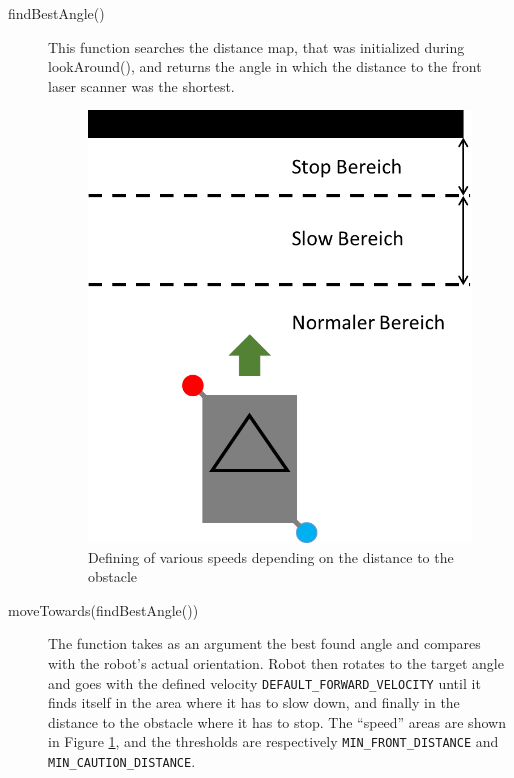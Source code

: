 \begin{description}
\item[findBestAngle()] This function searches the distance map, that was initialized during lookAround(), and returns the angle in which the distance to the front laser scanner was the shortest. 

\begin{figure}[ht]
\centering
\includegraphics[scale=0.6]{graphics/Zone.png}
\caption{Defining of various speeds depending on the distance to the obstacle}
\label{Zone}
\centering
\end{figure}

\item[moveTowards(findBestAngle())] The function takes as an argument the best found angle and compares with the robot's actual orientation. Robot then rotates to the target angle and goes with the defined velocity \texttt{DEFAULT\_FORWARD\_VELOCITY}
 until it finds itself in the area where it has to slow down, and finally in the distance to the obstacle where it has to stop. The ``speed'' areas are shown in Figure \ref{Zone}, and the thresholds are respectively \texttt{MIN\_FRONT\_DISTANCE} and \texttt{MIN\_CAUTION\_DISTANCE}. 
 

\end{description}
